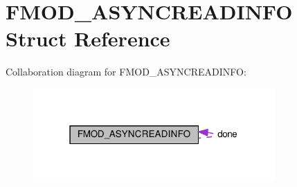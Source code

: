 \hypertarget{structFMOD__ASYNCREADINFO}{}\section{F\+M\+O\+D\+\_\+\+A\+S\+Y\+N\+C\+R\+E\+A\+D\+I\+N\+FO Struct Reference}
\label{structFMOD__ASYNCREADINFO}


Collaboration diagram for F\+M\+O\+D\+\_\+\+A\+S\+Y\+N\+C\+R\+E\+A\+D\+I\+N\+FO\+:
\nopagebreak
\begin{figure}[H]
\begin{center}
\leavevmode
\includegraphics[width=262pt]{structFMOD__ASYNCREADINFO__coll__graph}
\end{center}
\end{figure}
